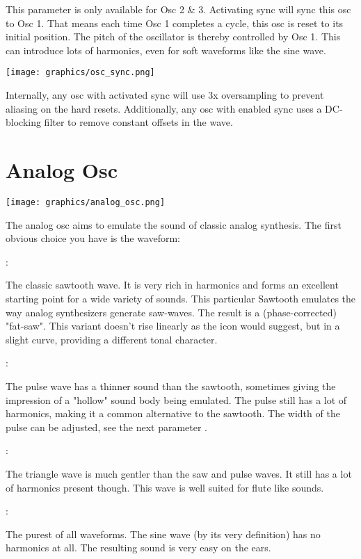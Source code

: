 {This parameter is only available for Osc 2 \& 3. Activating sync will sync this osc to Osc 1. That means each time Osc 1 completes a cycle, this osc is reset to its initial position. The pitch of the oscillator is thereby controlled by Osc 1. This can introduce lots of harmonics, even for soft waveforms like the sine wave.

\vspace{5mm}

\texttt{[image: graphics/osc\_sync.png]}

Internally, any osc with activated sync will use 3x oversampling to prevent aliasing on the hard resets. Additionally, any osc with enabled sync uses a DC-blocking filter to remove constant offsets in the wave.}

\section{Analog Osc}

\begin{center}
    \texttt{[image: graphics/analog\_osc.png]}
\end{center}

The analog osc aims to emulate the sound of classic analog synthesis. The first obvious choice you have is the waveform:

{

:

The classic sawtooth wave. It is very rich in harmonics and forms an excellent starting point for a wide variety of sounds. This particular Sawtooth emulates the way analog synthesizers generate saw-waves. The result is a (phase-corrected) "fat-saw". This variant doesn't rise linearly as the icon would suggest, but in a slight curve, providing a different tonal character.

:

The pulse wave has a thinner sound than the sawtooth, sometimes giving the impression of a "hollow" sound body being emulated. The pulse still has a lot of harmonics, making it a common alternative to the sawtooth. The width of the pulse can be adjusted, see the next parameter .

:

The triangle wave is much gentler than the saw and pulse waves. It still has a lot of harmonics present though. This wave is well suited for flute like sounds.

:

The purest of all waveforms. The sine wave (by its very definition) has no harmonics at all. The resulting sound is very easy on the ears.}

